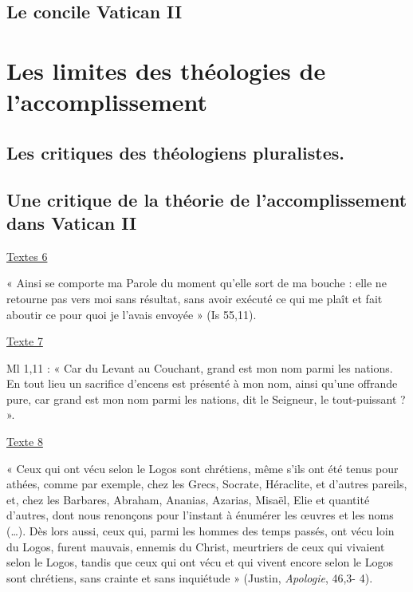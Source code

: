    
    
    \subsection{Le concile Vatican II}
    

 
  \section{Les limites des théologies de
  l'accomplissement}



   
    
    \subsection{Les critiques des théologiens pluralistes.}
    
   
    
    \subsection{Une critique de la théorie de l'accomplissement dans Vatican
    II}
    

 






 
\underline{Textes 6}

« Ainsi se comporte ma Parole du moment qu'elle sort de ma bouche : elle
ne retourne pas vers moi sans résultat, sans avoir exécuté ce qui me
plaît et fait aboutir ce pour quoi je l'avais envoyée » (Is 55,11).

\underline{Texte 7}

Ml 1,11 : « Car du Levant au Couchant, grand est mon nom parmi les
nations. En tout lieu un sacrifice d'encens est présenté à mon nom,
ainsi qu'une offrande pure, car grand est mon nom parmi les nations, dit
le Seigneur, le tout-puissant ? ».

\underline{Texte 8}

« Ceux qui ont vécu selon le Logos sont chrétiens, même s'ils ont été
tenus pour athées, comme par exemple, chez les Grecs, Socrate,
Héraclite, et d'autres pareils, et, chez les Barbares, Abraham, Ananias,
Azarias, Misaël, Elie et quantité d'autres, dont nous renonçons pour
l'instant à énumérer les œuvres et les noms (\ldots). Dès lors aussi,
ceux qui, parmi les hommes des temps passés, ont vécu loin du Logos,
furent mauvais, ennemis du Christ, meurtriers de ceux qui vivaient selon
le Logos, tandis que ceux qui ont vécu et qui vivent encore selon le
Logos sont chrétiens, sans crainte et sans inquiétude » (Justin,
\emph{Apologie}, 46,3- 4).

